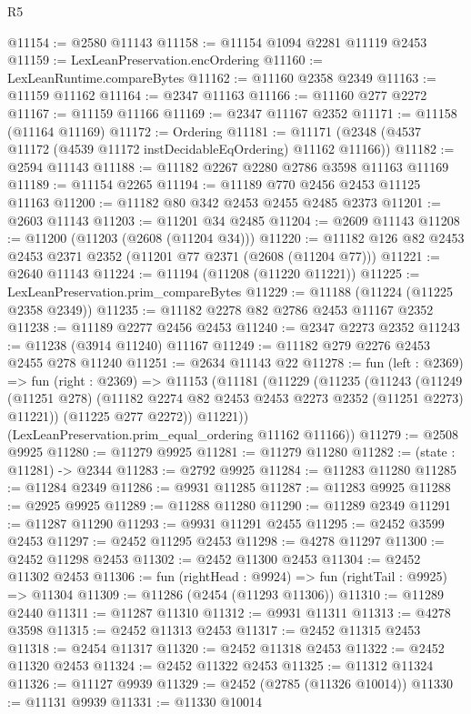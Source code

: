 \begin{lexlean}{R5}
\begin{coremodule}
@11154 := @2580 @11143
@11158 := @11154 @1094 @2281 @11119 @2453
@11159 := LexLeanPreservation.encOrdering
@11160 := LexLeanRuntime.compareBytes
@11162 := @11160 @2358 @2349
@11163 := @11159 @11162
@11164 := @2347 @11163
@11166 := @11160 @277 @2272
@11167 := @11159 @11166
@11169 := @2347 @11167 @2352
@11171 := @11158 (@11164 @11169)
@11172 := Ordering
@11181 := @11171 (@2348 (@4537 @11172 (@4539 @11172 instDecidableEqOrdering) @11162 @11166))
@11182 := @2594 @11143
@11188 := @11182 @2267 @2280 @2786 @3598 @11163 @11169
@11189 := @11154 @2265
@11194 := @11189 @770 @2456 @2453 @11125 @11163
@11200 := @11182 @80 @342 @2453 @2455 @2485 @2373
@11201 := @2603 @11143
@11203 := @11201 @34 @2485
@11204 := @2609 @11143
@11208 := @11200 (@11203 (@2608 (@11204 @34)))
@11220 := @11182 @126 @82 @2453 @2453 @2371 @2352 (@11201 @77 @2371 (@2608 (@11204 @77)))
@11221 := @2640 @11143
@11224 := @11194 (@11208 (@11220 @11221))
@11225 := LexLeanPreservation.prim_compareBytes
@11229 := @11188 (@11224 (@11225 @2358 @2349))
@11235 := @11182 @2278 @82 @2786 @2453 @11167 @2352
@11238 := @11189 @2277 @2456 @2453
@11240 := @2347 @2273 @2352
@11243 := @11238 (@3914 @11240) @11167
@11249 := @11182 @279 @2276 @2453 @2455 @278 @11240
@11251 := @2634 @11143 @22
@11278 := fun (left : @2369) =>
  fun (right : @2369) =>
  @11153
    (@11181
      (@11229
        (@11235
          (@11243
            (@11249 (@11251 @278) (@11182 @2274 @82 @2453 @2453 @2273 @2352 (@11251 @2273) @11221))
            (@11225 @277 @2272))
          @11221))
      (LexLeanPreservation.prim_equal_ordering @11162 @11166))
@11279 := @2508 @9925
@11280 := @11279 @9925
@11281 := @11279 @11280
@11282 := (state : @11281) -> @2344
@11283 := @2792 @9925
@11284 := @11283 @11280
@11285 := @11284 @2349
@11286 := @9931 @11285
@11287 := @11283 @9925
@11288 := @2925 @9925
@11289 := @11288 @11280
@11290 := @11289 @2349
@11291 := @11287 @11290
@11293 := @9931 @11291 @2455
@11295 := @2452 @3599 @2453
@11297 := @2452 @11295 @2453
@11298 := @4278 @11297
@11300 := @2452 @11298 @2453
@11302 := @2452 @11300 @2453
@11304 := @2452 @11302 @2453
@11306 := fun (rightHead : @9924) => fun (rightTail : @9925) => @11304
@11309 := @11286 (@2454 (@11293 @11306))
@11310 := @11289 @2440
@11311 := @11287 @11310
@11312 := @9931 @11311
@11313 := @4278 @3598
@11315 := @2452 @11313 @2453
@11317 := @2452 @11315 @2453
@11318 := @2454 @11317
@11320 := @2452 @11318 @2453
@11322 := @2452 @11320 @2453
@11324 := @2452 @11322 @2453
@11325 := @11312 @11324
@11326 := @11127 @9939
@11329 := @2452 (@2785 (@11326 @10014))
@11330 := @11131 @9939
@11331 := @11330 @10014

\end{coremodule}
\end{lexlean}
